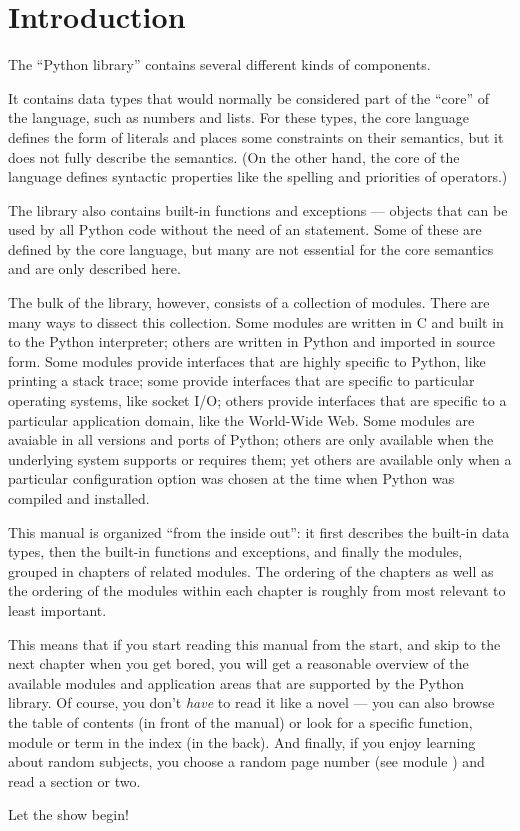 \chapter{Introduction}

The ``Python library'' contains several different kinds of components.

It contains data types that would normally be considered part of the
``core'' of the language, such as numbers and lists.  For these types,
the core language defines the form of literals and places some
constraints on their semantics, but it does not fully describe the
semantics.  (On the other hand, the core of the language defines
syntactic properties like the spelling and priorities of operators.)

The library also contains built-in functions and exceptions ---
objects that can be used by all Python code without the need of an
 statement.  Some of these are defined by the core
language, but many are not essential for the core semantics and are
only described here.

The bulk of the library, however, consists of a collection of modules.
There are many ways to dissect this collection.  Some modules are
written in C and built in to the Python interpreter; others are
written in Python and imported in source form.  Some modules provide
interfaces that are highly specific to Python, like printing a stack
trace; some provide interfaces that are specific to particular
operating systems, like socket I/O; others provide interfaces that are
specific to a particular application domain, like the World-Wide Web.
Some modules are avaiable in all versions and ports of Python; others
are only available when the underlying system supports or requires
them; yet others are available only when a particular configuration
option was chosen at the time when Python was compiled and installed.

This manual is organized ``from the inside out'': it first describes
the built-in data types, then the built-in functions and exceptions,
and finally the modules, grouped in chapters of related modules.  The
ordering of the chapters as well as the ordering of the modules within
each chapter is roughly from most relevant to least important.

This means that if you start reading this manual from the start, and
skip to the next chapter when you get bored, you will get a reasonable
overview of the available modules and application areas that are
supported by the Python library.  Of course, you don't \emph{have} to
read it like a novel --- you can also browse the table of contents (in
front of the manual) or look for a specific function, module or term
in the index (in the back).  And finally, if you enjoy learning about
random subjects, you choose a random page number (see module
) and read a section or two.

Let the show begin!
